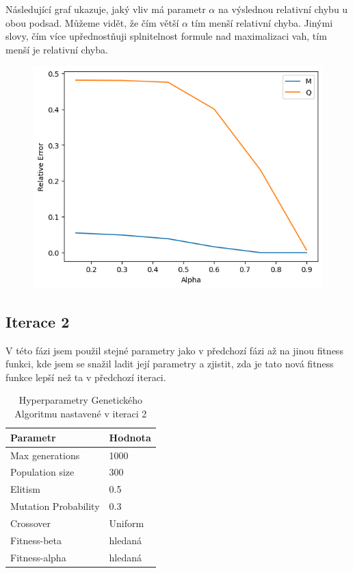 \documentclass[12pt]{article}
\begin{document}
Následující graf ukazuje, jaký vliv má parametr $\alpha$ na výslednou relativní chybu u obou podsad. Můžeme vidět, že čím větší $\alpha$ tím menší relativní chyba. Jinými slovy, čím více upřednostňuji splnitelnost formule nad maximalizaci vah, tím menší je relativní chyba.
\begin{figure}[H]
    \centering
    \begin{minipage}[b]{0.5\textwidth}
        \includegraphics[width=\textwidth]{images/relative_errors_alpha.png}
        \label{fig:ga_help}
    \end{minipage}
\end{figure}



\subsection{Iterace 2}

V této fázi jsem použil stejné parametry jako v předchozí fázi až na jinou fitness funkci, kde jsem se snažil ladit její parametry a zjistit, zda je tato nová fitness funkce lepší než ta v předchozí iteraci.

\begin{table}[H]
\centering
\caption{Hyperparametry Genetického Algoritmu nastavené v iteraci 2}
\begin{tabular}{@{}ll@{}}
\toprule
\textbf{Parametr}        & \textbf{Hodnota}       \\ \midrule
Max generations           & 1000                \\
Population size           & 300                 \\
Elitism                   & 0.5                 \\
Mutation Probability      & 0.3                 \\
Crossover                 & Uniform             \\
Fitness-beta              & hledaná            \\
Fitness-alpha             & hledaná                 \\ \bottomrule
\end{tabular}
\label{tab:ga_parameters}
\end{table}
\end{document}
